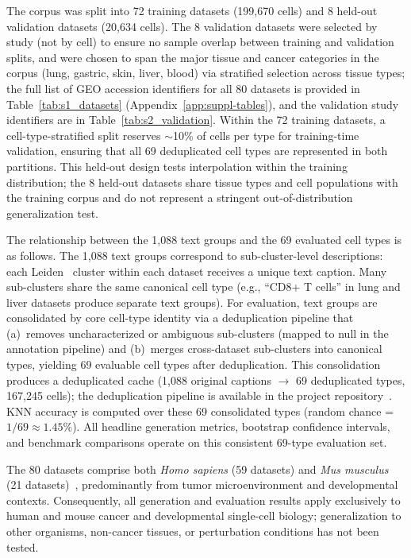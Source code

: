 \documentclass[preprint,12pt]{elsarticle}
\begin{document}
The corpus was split into 72 training datasets (199,670 cells) and 8 held-out validation datasets (20,634 cells). The 8 validation datasets were selected by study (not by cell) to ensure no sample overlap between training and validation splits, and were chosen to span the major tissue and cancer categories in the corpus (lung, gastric, skin, liver, blood) via stratified selection across tissue types; the full list of GEO accession identifiers for all 80 datasets is provided in Table~\ref{tab:s1_datasets} (Appendix~\ref{app:suppl-tables}), and the validation study identifiers are in Table~\ref{tab:s2_validation}. Within the 72 training datasets, a cell-type-stratified split reserves $\sim$10\% of cells per type for training-time validation, ensuring that all 69 deduplicated cell types are represented in both partitions. This held-out design tests interpolation within the training distribution; the 8 held-out datasets share tissue types and cell populations with the training corpus and do not represent a stringent out-of-distribution generalization test.

The relationship between the 1,088 text groups and the 69 evaluated cell types is as follows. The 1,088 text groups correspond to sub-cluster-level descriptions: each Leiden~\cite{ref-leiden} cluster within each dataset receives a unique text caption. Many sub-clusters share the same canonical cell type (e.g., ``CD8+ T cells'' in lung and liver datasets produce separate text groups). For evaluation, text groups are consolidated by core cell-type identity via a deduplication pipeline that (a)~removes uncharacterized or ambiguous sub-clusters (mapped to null in the annotation pipeline) and (b)~merges cross-dataset sub-clusters into canonical types, yielding 69 evaluable cell types after deduplication. This consolidation produces a deduplicated cache (1,088 original captions $\to$ 69 deduplicated types, 167,245 cells); the deduplication pipeline is available in the project repository~\cite{ref-clop-dit}. KNN accuracy is computed over these 69 consolidated types (random chance = $1/69 \approx 1.45\%$). All headline generation metrics, bootstrap confidence intervals, and benchmark comparisons operate on this consistent 69-type evaluation set.

The 80 datasets comprise both \textit{Homo sapiens} (59 datasets) and \textit{Mus musculus} (21 datasets)~\cite{ref-tabula-muris}, predominantly from tumor microenvironment and developmental contexts. Consequently, all generation and evaluation results apply exclusively to human and mouse cancer and developmental single-cell biology; generalization to other organisms, non-cancer tissues, or perturbation conditions has not been tested.
\end{document}
